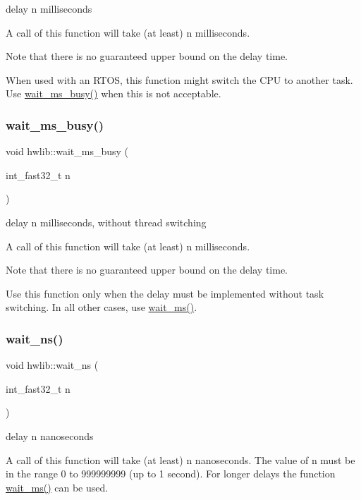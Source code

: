 delay n milliseconds

A call of this function will take (at least) n milliseconds.

Note that there is no guaranteed upper bound on the delay time.

When used with an R\+T\+OS, this function might switch the C\+PU to another task. Use \hyperlink{namespacehwlib_a15a3f36ce8b3f31473cdd8026b7e5960}{wait\+\_\+ms\+\_\+busy()} when this is not acceptable. \mbox{\label{namespacehwlib_a15a3f36ce8b3f31473cdd8026b7e5960}} 
\subsubsection{\texorpdfstring{wait\+\_\+ms\+\_\+busy()}{wait\_ms\_busy()}}
{\footnotesize\ttfamily void hwlib\+::wait\+\_\+ms\+\_\+busy (\begin{DoxyParamCaption}\item[{int\+\_\+fast32\+\_\+t}]{n }\end{DoxyParamCaption})}

delay n milliseconds, without thread switching

A call of this function will take (at least) n milliseconds.

Note that there is no guaranteed upper bound on the delay time.

Use this function only when the delay must be implemented without task switching. In all other cases, use \hyperlink{namespacehwlib_a6119aa5d3034176aa1515ef4bb193044}{wait\+\_\+ms()}. \mbox{\label{namespacehwlib_a9c01a1d0319f5eadd8926e66aea19aa0}} 
\subsubsection{\texorpdfstring{wait\+\_\+ns()}{wait\_ns()}}
{\footnotesize\ttfamily void hwlib\+::wait\+\_\+ns (\begin{DoxyParamCaption}\item[{int\+\_\+fast32\+\_\+t}]{n }\end{DoxyParamCaption})}

delay n nanoseconds

A call of this function will take (at least) n nanoseconds. The value of n must be in the range 0 to 999999999 (up to 1 second). For longer delays the function \hyperlink{namespacehwlib_a6119aa5d3034176aa1515ef4bb193044}{wait\+\_\+ms()} can be used.

